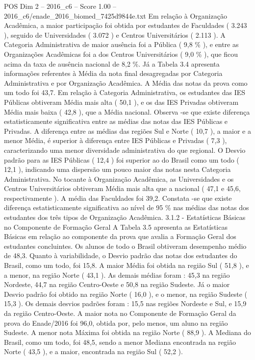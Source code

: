 \begin{textsample}{POS Dim 2 – 2016\_c6 – Score 1.00 – 2016\_c6/enade\_2016\_biomed\_7425d9844e.txt}
Em relação à Organização Acadêmica, a maior participação foi obtida por estudantes de Faculdades ( 3.243 ), seguido de Universidades ( 3.072 ) e Centros Universitários ( 2.113 ).
A Categoria Administrativa de maior ausência foi a Pública ( 9,8 \% ), e entre as Organizações Acadêmicas foi a dos Centros Universitários ( 9,0 \% ), que ficou acima da taxa de ausência nacional de 8,2 \%.
Já a Tabela 3.4 apresenta informações referentes à Média da nota final desagregadas por Categoria Administrativa e por Organização Acadêmica.
A Média das notas da prova como um todo foi 43,7.
Em relação à Categoria Administrativa, os estudantes das IES Públicas obtiveram Média mais alta ( 50,1 ), e os das IES Privadas obtiveram Média mais baixa ( 42,8 ), que a Média nacional.
Observa -se que existe diferença estatisticamente significativa entre as médias das notas das IES Públicas e Privadas.
A diferença entre as médias das regiões Sul e Norte ( 10,7 ), a maior e a menor Média, é superior à diferença entre IES Públicas e Privadas ( 7,3 ), caracterizando uma menor diversidade administrativa do que regional.
O Desvio padrão para as IES Públicas ( 12,4 ) foi superior ao do Brasil como um todo ( 12,1 ), indicando uma dispersão um pouco maior das notas nesta Categoria Administrativa.
No tocante à Organização Acadêmica, as Universidades e os Centros Universitários obtiveram Média mais alta que a nacional ( 47,1 e 45,6, respectivamente ).
A média das Faculdades foi 39,2.
Constata -se que existe diferença estatisticamente significativa ao nível de 95 \% nas médias das notas dos estudantes dos três tipos de Organização Acadêmica. 3.1.2 - Estatísticas Básicas no Componente de Formação Geral A Tabela 3.5 apresenta as Estatísticas Básicas em relação ao componente da prova que avalia a Formação Geral dos estudantes concluintes.
Os alunos de todo o Brasil obtiveram desempenho médio de 48,3.
Quanto à variabilidade, o Desvio padrão das notas dos estudantes do Brasil, como um todo, foi 15,8.
A maior Média foi obtida na região Sul ( 51,8 ), e a menor, na região Norte ( 43,1 ).
As demais médias foram : 45,3 na região Nordeste, 44,7 na região Centro-Oeste e 50,8 na região Sudeste.
Já o maior Desvio padrão foi obtido na região Norte ( 16,0 ), e o menor, na região Sudeste ( 15,3 ).
Os demais desvios padrões foram : 15,5 nas regiões Nordeste e Sul, e 15,9 da região Centro-Oeste.
A maior nota no Componente de Formação Geral da prova do Enade/2016 foi 96,0, obtida por, pelo menos, um aluno na região Sudeste.
A menor nota Máxima foi obtida na região Norte ( 88,9 ).
A Mediana do Brasil, como um todo, foi 48,5, sendo a menor Mediana encontrada na região Norte ( 43,5 ), e a maior, encontrada na região Sul ( 52,2 ).

\end{textsample}
